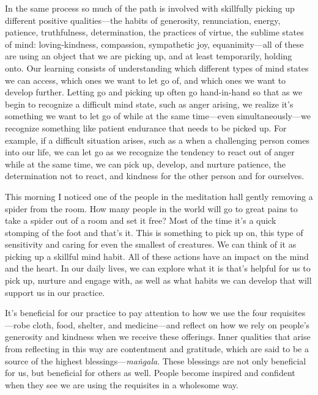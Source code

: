 In the same process so much of the path is involved with skillfully 
picking up different positive qualities---the habits of generosity, 
renunciation, energy, patience, truthfulness, determination, the 
practices of virtue, the sublime states of mind: loving-kindness, 
compassion, sympathetic joy, equanimity---all of these are using an 
object that we are picking up, and at least temporarily, holding onto. 
Our learning consists of understanding which different types of mind 
states we can access, which ones we want to let go of, and which ones 
we want to develop further. Letting go and picking up often go 
hand-in-hand so that as we begin to recognize a difficult mind state, 
such as anger arising, we realize it's something we want to let go of 
while at the same time---even simultaneously---we recognize something 
like patient endurance that needs to be picked up. For example, if a 
difficult situation arises, such as a when a challenging person comes 
into our life, we can let go as we recognize the tendency to react out 
of anger while at the same time, we can pick up, develop, and nurture 
patience, the determination not to react, and kindness for the other 
person and for ourselves.

This morning I noticed one of the people in the meditation hall gently 
removing a spider from the room. How many people in the world will go 
to great pains to take a spider out of a room and set it free? Most of 
the time it's a quick stomping of the foot and that's it. This is 
something to pick up on, this type of sensitivity and caring for even 
the smallest of creatures. We can think of it as picking up a skillful 
mind habit. All of these actions have an impact on the mind and the 
heart. In our daily lives, we can explore what it is that's helpful for 
us to pick up, nurture and engage with, as well as what habits we can 
develop that will support us in our practice.


It's beneficial for our practice to pay attention to how we use the 
four requisites---robe cloth, food, shelter, and medicine---and reflect 
on how we rely on people's generosity and kindness when we receive 
these offerings. Inner qualities that arise from reflecting in this way 
are contentment and gratitude, which are said to be a source of the 
highest blessings---\emph{maṅgala}. These blessings are not only 
beneficial for us, but beneficial for others as well. People become 
inspired and confident when they see we are using the requisites in a 
wholesome way.

